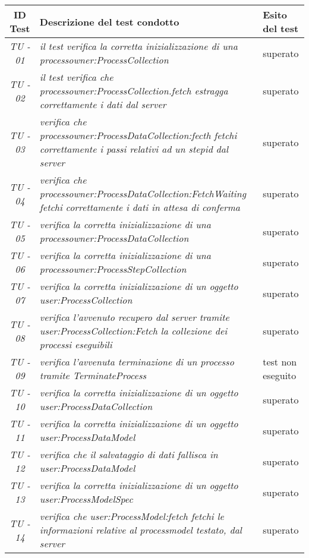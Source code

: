 \begin{small}\centering
\begin{tabular}{|c|p{8.0cm}|p{2.0cm}|}
\hline
\textbf{ID Test} & \textbf{Descrizione del test condotto} & \textbf{Esito del test} \\
\hline
\textit{TU - 01} &
\textit{il test verifica la corretta inizializzazione di una processowner:ProcessCollection} & superato \\
\hline
\textit{TU - 02} &
\textit{il test verifica che  processowner:ProcessCollection.fetch estragga correttamente i dati dal server } & superato \\
\hline
\textit{TU - 03} & 
\textit{verifica che processowner:ProcessDataCollection:fecth fetchi correttamente i passi relativi ad un stepid dal server} & superato  \\
\hline
\textit{TU - 04} &
\textit{verifica che processowner:ProcessDataCollection:FetchWaiting fetchi correttamente i dati in attesa di conferma} & superato  \\
\hline
\textit{TU - 05} &
\textit{verifica la corretta inizializzazione di una processowner:ProcessDataCollection } & superato \\
\hline
\textit{TU - 06} &
\textit{verifica la corretta inizializzazione di una processowner:ProcessStepCollection} & superato  \\
\hline
\textit{TU - 07} &
\textit{verifica la corretta inizializzazione di un oggetto user:ProcessCollection} &  superato\\
\hline
\textit{TU - 08} &
\textit{verifica l'avvenuto recupero dal server tramite user:ProcessCollection:Fetch la collezione dei processi eseguibili} & superato \\
\hline
\textit{TU - 09} &
\textit{verifica l'avvenuta terminazione di un processo tramite TerminateProcess} & test non eseguito \\
\hline
\textit{TU - 10} &
\textit{verifica la corretta inizializzazione di un oggetto user:ProcessDataCollection} & superato \\
\hline
\textit{TU - 11} &
\textit{verifica la corretta inizializzazione di un oggetto user:ProcessDataModel} & superato \\
\hline
\textit{TU - 12} &
\textit{verifica che il salvataggio di dati fallisca in user:ProcessDataModel} & superato \\
\hline
\textit{TU - 13} &
\textit{verifica la corretta inizializzazione di un oggetto user:ProcessModelSpec} & superato \\
\hline
\textit{TU - 14} &
\textit{verifica che user:ProcessModel:fetch fetchi le informazioni relative al processmodel testato, dal server} & superato \\
\hline
\end{tabular}\\
\end{small}

